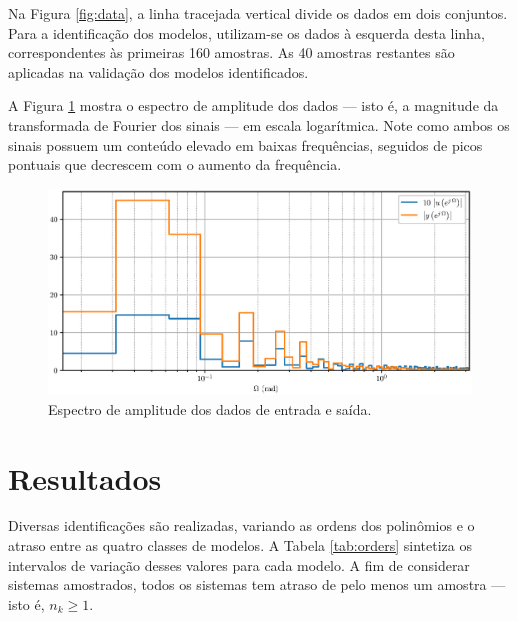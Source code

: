 \documentclass{ppgeesa}
\begin{document}
Na Figura \ref{fig:data}, a linha tracejada vertical divide os dados em dois conjuntos.
Para a identificação dos modelos, utilizam-se os dados à esquerda desta linha, correspondentes às primeiras 160 amostras.
As 40 amostras restantes são aplicadas na validação dos modelos identificados.

A Figura \ref{fig:data_fourier} mostra o espectro de amplitude dos dados --- isto é, a magnitude da transformada de Fourier dos sinais --- em escala logarítmica.
Note como ambos os sinais possuem um conteúdo elevado em baixas frequências, seguidos de picos pontuais que decrescem com o aumento da frequência.
\begin{figure}[!htbp]
  \centering
  \includegraphics[width=\linewidth]{data_fourier_log}
  \caption{Espectro de amplitude dos dados de entrada e saída.}
  \label{fig:data_fourier}
\end{figure}

\section{Resultados}

Diversas identificações são realizadas, variando as ordens dos polinômios e o atraso entre as quatro classes de modelos.
A Tabela \ref{tab:orders} sintetiza os intervalos de variação desses valores para cada modelo.
A fim de considerar sistemas amostrados, todos os sistemas tem atraso de pelo menos um amostra --- isto é, $n_k \geq 1$.
\end{document}
